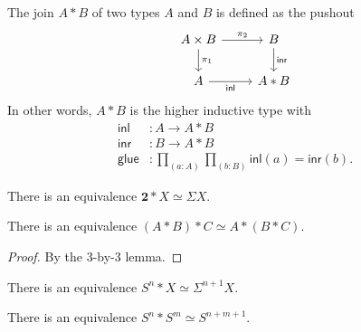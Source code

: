 \documentclass[handout]{beamer}
\newcommand{\sphere}[1]{S^{#1}}
\newcommand{\inl}{\mathsf{inl}}
\newcommand{\inr}{\mathsf{inr}}
\newcommand{\glue}{\mathsf{glue}}
\begin{document}
\begin{frame}
  \begin{definition}
    The join $A\ast B$ of two types $A$ and $B$ is defined as the pushout
    \begin{equation*}
      \begin{tikzcd}[ampersand replacement=\&]
        A\times B \arrow[d,"\pi_1"] \arrow[r,"\pi_2"] \& B \arrow[d,"\inr"] \\
        A \arrow[r,swap,"\inl"] \& A\ast B
      \end{tikzcd}
    \end{equation*}
    In other words, $A\ast B$ is the higher inductive type with
    \begin{align*}
      \inl & : A \to A \ast B \\
      \inr & : B \to A \ast B \\
      \glue & : \prod_{(a:A)}\prod_{(b : B)}\inl(a)=\inr(b).
    \end{align*}
  \end{definition}
\end{frame}

\begin{frame}
  \begin{theorem}
    There is an equivalence $\mathbf{2}\ast X\simeq \Sigma X$.
  \end{theorem}
  \begin{theorem}
    There is an equivalence $(A\ast B)\ast C\simeq A\ast(B\ast C)$. 
  \end{theorem}

  \begin{proof}
    By the 3-by-3 lemma.
  \end{proof}
  
  \begin{corollary}
    There is an equivalence $\sphere{n}\ast X\simeq \Sigma^{n+1}X$.
  \end{corollary}
  \begin{corollary}
    There is an equivalence $\sphere{n}\ast\sphere{m}\simeq \sphere{n+m+1}$. 
  \end{corollary}
\end{frame}
\end{document}
